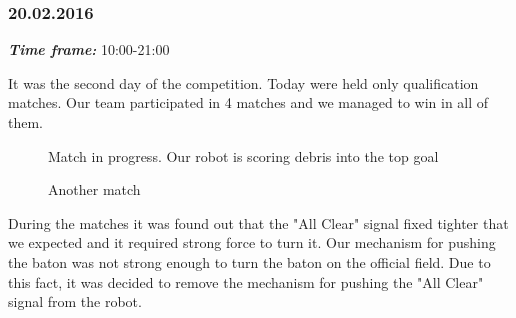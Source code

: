 \subsubsection{20.02.2016}
\textit{\textbf{Time frame:}} 10:00-21:00 

It was the second day of the competition. Today were held only qualification matches. Our team participated in 4 matches and we managed to win in all of them.

\begin{figure}[H]
	\begin{minipage}[h]{0.47\linewidth}
		\caption{Match in progress. Our robot is scoring debris into the top goal}
	\end{minipage}
	\hfill
	\begin{minipage}[h]{0.47\linewidth}
		\caption{Another match}
	\end{minipage}
\end{figure}

During the matches it was found out that the "All Clear" signal fixed tighter that we expected and it required strong force to turn it. Our mechanism for pushing the baton was not strong enough to turn the baton on the official field. Due to this fact, it was decided to remove the mechanism for pushing the "All Clear" signal from the robot.